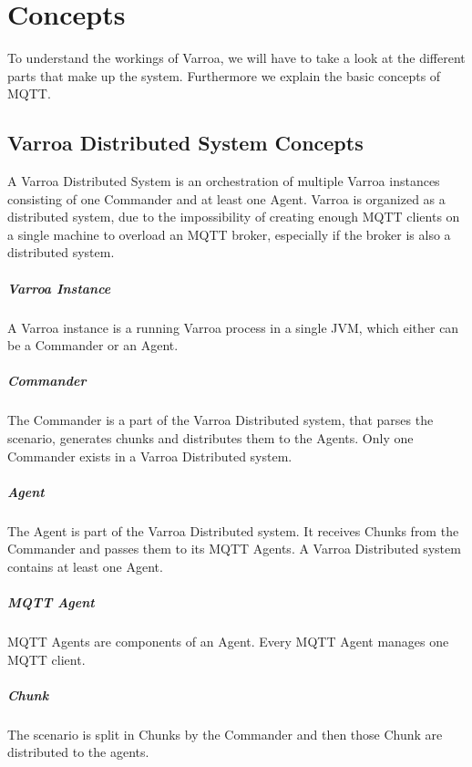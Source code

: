 \chapter{Concepts}
To understand the workings of Varroa, we will have to take a look at the different parts that make up the system.
Furthermore we explain the basic concepts of MQTT.

\section{Varroa Distributed System Concepts}
A Varroa Distributed System is an orchestration of multiple Varroa instances consisting of one Commander and at least one Agent.
Varroa is organized as a distributed system, due to the impossibility of creating enough MQTT clients on a single machine to overload an MQTT broker, especially if the broker is also a distributed system.

\paragraph{Varroa Instance}
A Varroa instance is a running Varroa process in a single JVM, which either can be a Commander or an Agent.

\paragraph{Commander}
The Commander is a part of the Varroa Distributed system, that parses the scenario, generates chunks and distributes them to the Agents.
Only one Commander exists in a Varroa Distributed system.

\paragraph{Agent}
The Agent is part of the Varroa Distributed system.
It receives Chunks from the Commander and passes them to its MQTT Agents.
A Varroa Distributed system contains at least one Agent.

\paragraph{MQTT Agent}
MQTT Agents are components of an Agent.
Every MQTT Agent manages one MQTT client.

\paragraph{Chunk}
The scenario is split in Chunks by the Commander and then those Chunk are distributed to the agents.

